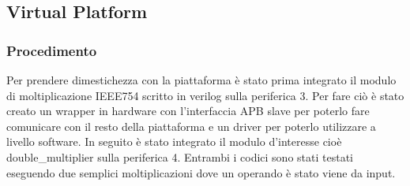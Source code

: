 \documentclass[]{IEEEtran}
\begin{document}
\subsection{Virtual Platform}

\subsubsection{Procedimento}
Per prendere dimestichezza con la piattaforma è stato prima integrato il modulo di moltiplicazione IEEE754 scritto in verilog sulla periferica 3. Per fare ciò è stato creato un wrapper in hardware con l'interfaccia APB slave per poterlo fare comunicare con il resto della piattaforma e un driver per poterlo utilizzare a livello software. In seguito è stato integrato il modulo d'interesse cioè double\_multiplier sulla periferica 4. Entrambi i codici sono stati testati eseguendo due semplici moltiplicazioni dove un operando è stato viene da input.\\
\end{document}
